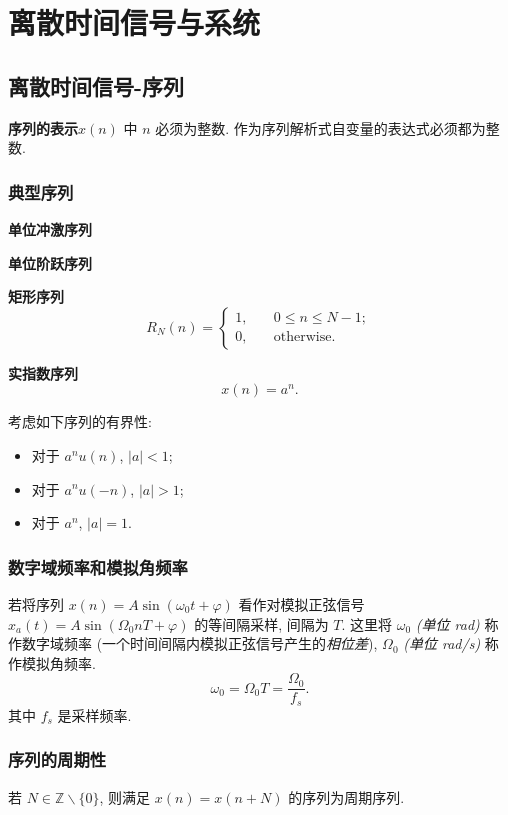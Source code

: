 \section{离散时间信号与系统}
\subsection{离散时间信号-序列}
\textbf{序列的表示}\quad $x(n)$ 中 $n$ 必须为整数. 作为序列解析式自变量的表达式必须都为整数.

\subsubsection{典型序列}
\textbf{单位冲激序列}

\textbf{单位阶跃序列}

\textbf{矩形序列}
\begin{equation}
    R_N(n)=\begin{cases}
        1, & \quad 0\leq n\leq N-1;  \\
        0, & \quad \text{otherwise}.
    \end{cases}
\end{equation}

\textbf{实指数序列}
\begin{equation}
    x(n)=a^n.
\end{equation}

考虑如下序列的有界性:
\begin{itemize}
    \item 对于 $a^nu(n)$, $|a|<1$;
    \item 对于 $a^nu(-n)$, $|a|>1$;
    \item 对于 $a^n$, $|a|=1$.
\end{itemize}

\subsubsection{数字域频率和模拟角频率}
若将序列 $x(n)=A\sin(\omega_0t+\varphi)$ 看作对模拟正弦信号 $x_a(t)=A\sin(\Omega_0nT+\varphi)$ 的等间隔采样, 间隔为 $T$. 这里将 $\omega_0$ \textit{(单位 \unit{rad})} 称作数字域频率 (一个时间间隔内模拟正弦信号产生的\textit{相位差}), $\Omega_0$ \textit{(单位 \unit{rad/s})} 称作模拟角频率.
\begin{equation}
    \omega_0=\Omega_0T=\frac{\Omega_0}{f_s}.
\end{equation}
其中 $f_s$ 是采样频率.

\subsubsection{序列的周期性}
若 $N\in\mathbb{Z}\backslash\{0\}$, 则满足 $x(n)=x(n+N)$ 的序列为周期序列.

